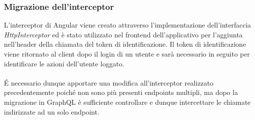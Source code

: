 \subsubsection*{Migrazione dell'interceptor}
L'interceptor di Angular viene creato attraverso l'implementazione dell'interfaccia \textit{HttpInterceptor} ed è stato utilizzato nel frontend dell'applicativo per l'aggiunta nell'header della chiamata del token di identificazione. Il token di identificazione viene ritornato al client dopo il login di un utente e sarà necessario in seguito per identificare le azioni dell'utente loggato.\\ \\
É necessario dunque apportare una modifica all'interceptor realizzato precedentemente poiché non sono più presenti endpoints multipli, ma dopo la migrazione in GraphQL è sufficiente controllare e dunque intercettare le chiamate indirizzate ad un solo endpoint.
